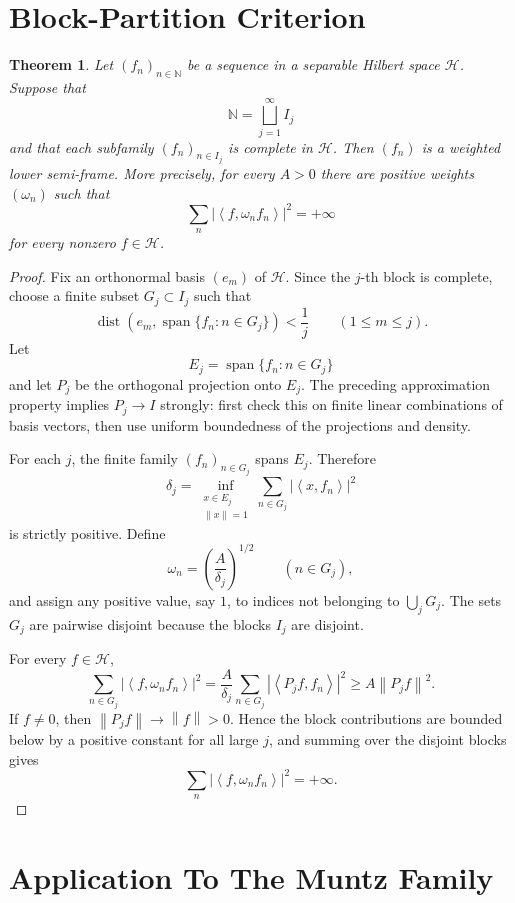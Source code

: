 \documentclass[11pt]{article}
\newtheorem{theorem}{Theorem}
\newcommand{\Hcal}{\mathcal H}
\newcommand{\N}{\mathbb N}
\newcommand{\ip}[2]{\left\langle #1,#2\right\rangle}
\newcommand{\norm}[1]{\left\lVert #1\right\rVert}
\begin{document}
\section*{Block-Partition Criterion}

\begin{theorem}
Let \((f_n)_{n\in\N}\) be a sequence in a separable Hilbert space
\(\Hcal\). Suppose that
\[
\N=\bigsqcup_{j=1}^{\infty} I_j
\]
and that each subfamily \((f_n)_{n\in I_j}\) is complete in \(\Hcal\).
Then \((f_n)\) is a weighted lower semi-frame. More precisely, for every
\(A>0\) there are positive weights \((\omega_n)\) such that
\[
\sum_n |\ip{f}{\omega_n f_n}|^2=+\infty
\]
for every nonzero \(f\in\Hcal\).
\end{theorem}

\begin{proof}
Fix an orthonormal basis \((e_m)\) of \(\Hcal\). Since the \(j\)-th block
is complete, choose a finite subset \(G_j\subset I_j\) such that
\[
\operatorname{dist}(e_m,\operatorname{span}\{f_n:n\in G_j\})<\frac1j
\qquad (1\le m\le j).
\]
Let
\[
E_j=\operatorname{span}\{f_n:n\in G_j\}
\]
and let \(P_j\) be the orthogonal projection onto \(E_j\). The preceding
approximation property implies \(P_j\to I\) strongly: first check this
on finite linear combinations of basis vectors, then use uniform
boundedness of the projections and density.

For each \(j\), the finite family \((f_n)_{n\in G_j}\) spans \(E_j\).
Therefore
\[
\delta_j
=\inf_{\substack{x\in E_j\\ \norm{x}=1}}
\sum_{n\in G_j}|\ip{x}{f_n}|^2
\]
is strictly positive. Define
\[
\omega_n=\left(\frac{A}{\delta_j}\right)^{1/2}
\qquad (n\in G_j),
\]
and assign any positive value, say \(1\), to indices not belonging to
\(\bigcup_jG_j\). The sets \(G_j\) are pairwise disjoint because the
blocks \(I_j\) are disjoint.

For every \(f\in\Hcal\),
\[
\sum_{n\in G_j}|\ip{f}{\omega_n f_n}|^2
=\frac{A}{\delta_j}\sum_{n\in G_j}|\ip{P_jf}{f_n}|^2
\ge A\norm{P_jf}^2 .
\]
If \(f\ne0\), then \(\norm{P_jf}\to\norm{f}>0\). Hence the block
contributions are bounded below by a positive constant for all large
\(j\), and summing over the disjoint blocks gives
\[
\sum_n |\ip{f}{\omega_n f_n}|^2=+\infty .
\]
\end{proof}

\section*{Application To The Muntz Family}
\end{document}
